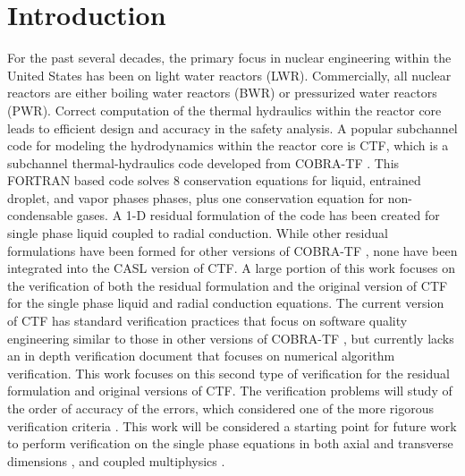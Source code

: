 \vspace*{-80mm}
\chapter{Introduction} \label{chapter1:introduction}

For the past several decades, the primary focus in nuclear engineering within
the United States has been on light water reactors (LWR). Commercially,
all nuclear reactors are either boiling water reactors (BWR) or pressurized
water reactors (PWR). Correct computation of the thermal hydraulics within the
reactor core leads to efficient design and accuracy in the safety analysis. A
popular subchannel code for modeling the hydrodynamics within the reactor core
is CTF, which is a subchannel thermal-hydraulics code developed from
COBRA-TF \cite{Salko2014}. This FORTRAN based code solves 8 conservation
equations for liquid, entrained droplet, and vapor phases phases, plus one
conservation equation for non-condensable gases. A 1-D residual formulation of
the code has been created for single phase liquid coupled to radial conduction.
While other residual formulations have been formed for other versions of
COBRA-TF \cite{Lloyd2014}, none have been integrated into the CASL version of
CTF. A large portion of this work focuses on the verification of both the
residual formulation and the original version of CTF for the single phase liquid
and radial conduction equations. The current version of CTF has standard
verification practices that focus on software quality engineering similar to
those in other versions of COBRA-TF \cite{Aumiller2013}, but currently lacks an
in depth verification document that focuses on numerical algorithm verification.
This work focuses on this second type of verification for the residual
formulation and original versions of CTF. The verification problems will study
of the order of accuracy of the errors, which considered one of the more
rigorous verification criteria \cite{Roy2005}. This work will be
considered a starting point for future work to perform verification
on the single phase equations in both axial and transverse dimensions
\cite{Merroun2009}, and coupled multiphysics \cite{Mahadevan2009}.

